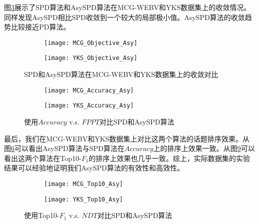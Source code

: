 图\ref{fig:MCG_YKS_Objective_AsySPD}展示了SPD算法和AsySPD算法在MCG-WEBV和YKS数据集上的收敛情况。同样发现AsySPD相比SPD收敛到一个较大的局部极小值。AsySPD算法的收敛趋势比较接近PD算法。
\begin{figure}[!htbp]
    \centering
    \begin{subfigure}[b]{0.5\textwidth}
      \texttt{[image: MCG\_Objective\_Asy]}
      \caption{}
      \label{fig:MCG_Objective_Asy}
    \end{subfigure}%
    \begin{subfigure}[b]{0.5\textwidth}
      \texttt{[image: YKS\_Objective\_Asy]}
      \caption{}
      \label{fig:YKS_Objective_Asy}
    \end{subfigure}
    \caption{SPD和AsySPD算法在MCG-WEBV和YKS数据集上的收敛对比}
    \label{fig:MCG_YKS_Objective_AsySPD}
\end{figure}

\begin{figure}[!htbp]
    \centering
    \begin{subfigure}[b]{0.5\textwidth}
      \texttt{[image: MCG\_Accuracy\_Asy]}
      \caption{}
      \label{fig:MCG_Accuracy_Asy}
    \end{subfigure}%
    \begin{subfigure}[b]{0.5\textwidth}
      \texttt{[image: YKS\_Accuracy\_Asy]}
      \caption{}
      \label{fig:YKS_Accuracy_Asy}
    \end{subfigure}
    \caption{使用$Accuracy$ v.s. $FPPT$对比SPD和AsySPD算法}
    \label{fig:MCG_YKS_Accuracy_AsySPD}
\end{figure}
最后，我们在MCG-WEBV和YKS数据集上对比这两个算法的话题排序效果。从图\ref{fig:MCG_YKS_Accuracy_AsySPD}可以看出AsySPD算法与SPD算法在$Accuracy$上的排序上效果一致。从图\ref{fig:MCG_YKS_Top10_AsySPD}可以看出这两个算法在Top10-$F_1$的排序上效果也几乎一致。综上，实际数据集的实验结果可以经验地证明我们AsySPD算法的有效性和高效性。
\begin{figure}[!htbp]
    \centering
    \begin{subfigure}[b]{0.5\textwidth}
      \texttt{[image: MCG\_Top10\_Asy]}
      \caption{}
      \label{fig:MCG_Top10_Asy}
    \end{subfigure}%
    \begin{subfigure}[b]{0.5\textwidth}
      \texttt{[image: YKS\_Top10\_Asy]}
      \caption{}
      \label{fig:YKS_Top10_Asy}
    \end{subfigure}
    \caption{使用Top10-$F_1$ v.s. $NDT$对比SPD和AsySPD算法}
    \label{fig:MCG_YKS_Top10_AsySPD}
\end{figure}



